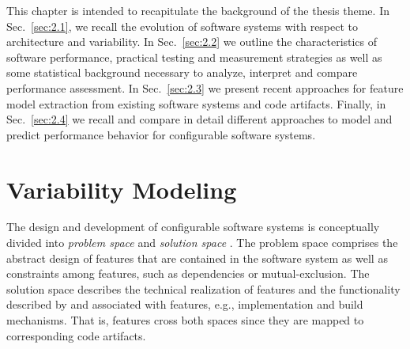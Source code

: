 This chapter is intended to recapitulate the background of the thesis theme. In
Sec.~\ref{sec:2.1}, we recall the evolution of software systems with respect to
architecture and variability. In Sec.~\ref{sec:2.2} we outline the characteristics
of software performance, practical testing and measurement strategies as well as
some statistical background necessary to analyze, interpret and compare
performance assessment. In Sec.~\ref{sec:2.3} we present recent approaches for
feature model extraction from existing software systems and code artifacts. Finally, in
Sec.~\ref{sec:2.4} we recall and compare in detail different approaches to model
and predict performance behavior for configurable software systems.

\section{Variability Modeling}
{\color{violet}
The design and development of configurable software systems is conceptually
divided into \emph{problem space} and \emph{solution space} \citep{czarnecki_generative_2000}. The problem space
comprises the abstract design of features that are contained in the software system as well as
constraints among features, such as dependencies or mutual-exclusion. The
solution space describes the technical realization of features and the
functionality described by and associated with features, e.g., implementation
and build mechanisms. That is, features cross both spaces since they are mapped
to corresponding code artifacts.}


